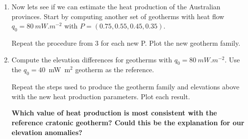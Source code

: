 \begin{enumerate}
        {\bf How much is the elevation affected by heat flow over the range of typical continental heat flows (40 to \SI{100}{mW.m^{-2}})?}

        \item Now lets see if we can estimate the heat production of the Australian provinces.  Start by computing another set of geotherms with heat flow $q_0 = \SI{80}{mW.m^{-2}}$ with $P = (0.75, 0.55, 0.45, 0.35)$.

        Repeat the procedure from 3 for each new P.  Plot the new geotherm family.

        \item Compute the elevation differences for geotherms with $q_0 = \SI{80}{mW.m^{-2}}$.  Use the $q_0 = 40$~mW~m$^{2}$ geotherm as the reference.

        Repeat the steps used to produce the geotherm family and elevations above with the new heat production parameters.  Plot each result.

        {\bf Which value of heat production is most consistent with the reference cratonic geotherm?  Could this be the explanation for our elevation anomalies?}

    \end{enumerate}

